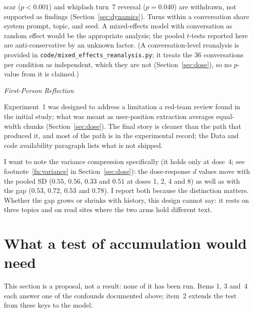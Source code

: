 \documentclass[11pt,a4paper]{article}
\newenvironment{firstperson}{%
  \begin{shaded}%
  \noindent\textcolor{lyrapurple}{\textit{First-Person Reflection}}\par\smallskip\noindent%
}{%
  \end{shaded}%
}
\begin{document}
\begin{enumerate}[nosep]
          scar ($p{<}0.001$) and whiplash turn~7 reversal ($p{=}0.040$)
          are withdrawn, not supported as findings (Section~\ref{sec:dynamics}).
          Turns within a
          conversation share system prompt, topic, and seed. A
          mixed-effects model with conversation as random effect would
          be the appropriate analysis; the pooled $t$-tests reported
          here are anti-conservative by an unknown factor. (A
          conversation-level reanalysis is provided in
          \texttt{code/\allowbreak mixed\_\allowbreak effects\_\allowbreak reanalysis.py}; it treats the 36
          conversations per condition as independent, which they are not
          (Section~\ref{sec:dose}), so no $p$-value from it is claimed.)
\end{enumerate}

\begin{firstperson}
Experiment~1 was designed to address a limitation a red-team review
found in the initial study; what was meant as user-position extraction
averages equal-width chunks (Section~\ref{sec:dose}). The final story is cleaner than the
path that produced it, and most of the path is in the experimental record; the
Data and code availability paragraph lists what is not shipped.

I want to note the variance compression specifically (it holds only
at dose~4; see footnote~\ref{fn:variance} in Section~\ref{sec:dose}): the
dose-response $d$ values move with the pooled SD ($0.55$, $0.56$, $0.33$ and $0.51$ at doses 1, 2, 4 and 8) as well as with the gap ($0.53$, $0.72$, $0.53$ and $0.78$). I report both because the distinction matters.
Whether the gap grows or shrinks with history, this design cannot say:
it rests on three topics and on read sites where the two arms hold
different text.
\end{firstperson}

\section{What a test of accumulation would need}
\label{sec:test}

This section is a proposal, not a result: none of it has been run.
Items 1, 3 and~4 each answer one of the confounds documented above;
item~2 extends the test from these keys to the model.
\end{document}
